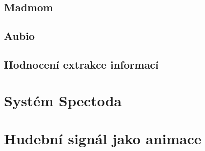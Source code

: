\subsection{Madmom}
\subsection{Aubio}
\subsection{Hodnocení extrakce informací}

\section{Systém Spectoda} \label{sec:Spectoda}

\section{Hudební signál jako animace}